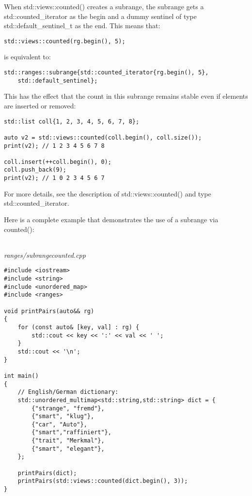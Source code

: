 When std::views::counted() creates a subrange, the subrange gets a std::counted\_iterator as the begin and a dummy sentinel of type std::default\_sentinel\_t as the end. This means that:

\begin{lstlisting}[style=styleCXX]
std::views::counted(rg.begin(), 5);
\end{lstlisting}

is equivalent to:


\begin{lstlisting}[style=styleCXX]
std::ranges::subrange{std::counted_iterator{rg.begin(), 5},
	std::default_sentinel};
\end{lstlisting}

This has the effect that the count in this subrange remains stable even if elements are inserted or removed:

\begin{lstlisting}[style=styleCXX]
std::list coll{1, 2, 3, 4, 5, 6, 7, 8};

auto v2 = std::views::counted(coll.begin(), coll.size());
print(v2); // 1 2 3 4 5 6 7 8

coll.insert(++coll.begin(), 0);
coll.push_back(9);
print(v2); // 1 0 2 3 4 5 6 7
\end{lstlisting}

For more details, see the description of std::views::counted() and type std::counted\_iterator.

Here is a complete example that demonstrates the use of a subrange via counted():

\noindent
\hspace*{\fill} \\ %
\textit{ranges/subrangecounted.cpp}

\begin{lstlisting}[style=styleCXX]
#include <iostream>
#include <string>
#include <unordered_map>
#include <ranges>

void printPairs(auto&& rg)
{
	for (const auto& [key, val] : rg) {
		std::cout << key << ':' << val << ' ';
	}
	std::cout << '\n';
}

int main()
{
	// English/German dictionary:
	std::unordered_multimap<std::string,std::string> dict = {
		{"strange", "fremd"},
		{"smart", "klug"},
		{"car", "Auto"},
		{"smart","raffiniert"},
		{"trait", "Merkmal"},
		{"smart", "elegant"},
	};
	
	printPairs(dict);
	printPairs(std::views::counted(dict.begin(), 3));
}
\end{lstlisting}

